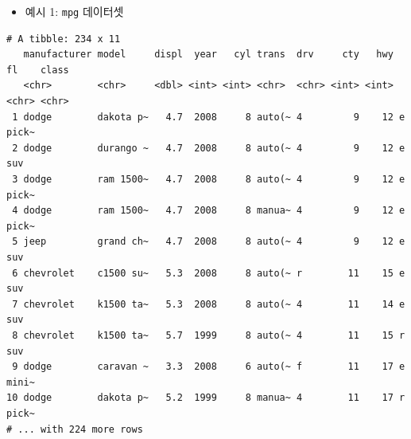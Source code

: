 \documentclass[
  11pt,
]{krantz}
\newenvironment{Shaded}{\begin{snugshade}}{\end{snugshade}}
\newcommand{\CommentTok}[1]{\textcolor[rgb]{0.37,0.37,0.37}{\textit{#1}}}
\newcommand{\KeywordTok}[1]{\textcolor[rgb]{0.27,0.27,0.27}{\textbf{#1}}}
\newcommand{\NormalTok}[1]{#1}
\newcommand{\OperatorTok}[1]{\textcolor[rgb]{0.43,0.43,0.43}{\textbf{#1}}}
\newcommand{\StringTok}[1]{\textcolor[rgb]{0.5,0.5,0.5}{#1}}
\providecommand{\tightlist}{%
  \setlength{\itemsep}{0pt}\setlength{\parskip}{0pt}}
\begin{document}
\begin{itemize}
\tightlist
\item
  예시 1: \texttt{mpg} 데이터셋
\end{itemize}

\footnotesize

\begin{Shaded}
\end{Shaded}

\begin{verbatim}
# A tibble: 234 x 11
   manufacturer model     displ  year   cyl trans  drv     cty   hwy fl    class
   <chr>        <chr>     <dbl> <int> <int> <chr>  <chr> <int> <int> <chr> <chr>
 1 dodge        dakota p~   4.7  2008     8 auto(~ 4         9    12 e     pick~
 2 dodge        durango ~   4.7  2008     8 auto(~ 4         9    12 e     suv  
 3 dodge        ram 1500~   4.7  2008     8 auto(~ 4         9    12 e     pick~
 4 dodge        ram 1500~   4.7  2008     8 manua~ 4         9    12 e     pick~
 5 jeep         grand ch~   4.7  2008     8 auto(~ 4         9    12 e     suv  
 6 chevrolet    c1500 su~   5.3  2008     8 auto(~ r        11    15 e     suv  
 7 chevrolet    k1500 ta~   5.3  2008     8 auto(~ 4        11    14 e     suv  
 8 chevrolet    k1500 ta~   5.7  1999     8 auto(~ 4        11    15 r     suv  
 9 dodge        caravan ~   3.3  2008     6 auto(~ f        11    17 e     mini~
10 dodge        dakota p~   5.2  1999     8 manua~ 4        11    17 r     pick~
# ... with 224 more rows
\end{verbatim}

\begin{Shaded}
\end{Shaded}
\end{document}

